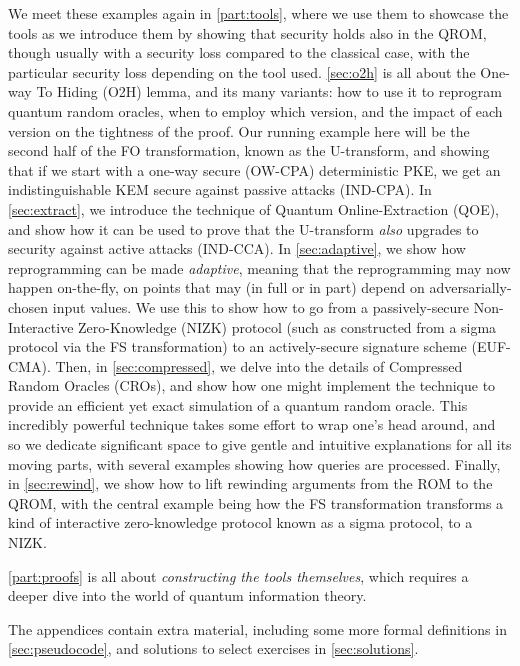     We meet these examples again in \cref{part:tools}, where we use
      them to showcase the tools as we introduce them by showing that security
      holds also in the QROM, though usually with a security loss compared to the
      classical case, with the particular security loss depending on the tool used.
      \cref{sec:o2h} is all about the One-way To Hiding (O2H) lemma, and its many variants: 
      how to use it to reprogram quantum random oracles, when to employ which
      version, and the impact of each version on the tightness of the proof. 
      Our running example here
      will be the second half of the FO transformation, known as the U-transform,
      and showing that if we start with a one-way secure (OW-CPA) deterministic PKE, we
      get an indistinguishable KEM secure against passive attacks (IND-CPA). 
      In \cref{sec:extract}, we introduce the technique of
      Quantum Online-Extraction (QOE), and show how it can be used to prove
      that the U-transform \emph{also} upgrades to security against active attacks
      (IND-CCA).
      In \cref{sec:adaptive}, we show how reprogramming can be made
      \emph{adaptive}, meaning that the reprogramming may now happen
      on-the-fly, on points that may (in full or in part) depend on
      adversarially-chosen input values. We use this to show
      how to go from a passively-secure Non-Interactive Zero-Knowledge (NIZK)
      protocol (such as constructed from a sigma protocol via the FS
      transformation) to an actively-secure signature scheme (EUF-CMA).
      Then, in \cref{sec:compressed}, we delve into the details of 
      Compressed Random Oracles (CROs), and show how one might implement the
      technique to provide an efficient yet exact simulation of a quantum
      random oracle.
      This incredibly powerful technique takes some effort to wrap one's head
      around, and so we dedicate significant space to give gentle and
      intuitive explanations for all its moving parts, with several examples
      showing how queries are processed.
    \ifdraftversion
      Finally, in \cref{sec:rewind}, we show how to lift rewinding arguments
      from the ROM to the QROM, with the central example being how the FS
      transformation transforms a kind of interactive zero-knowledge protocol known
      as a sigma protocol, to a NIZK.
    \fi

    \ifdraftversion
    \cref{part:proofs} is all about \emph{constructing the tools
      themselves}, which requires a deeper dive into the world of quantum
      information theory.
    \fi

    The appendices contain extra material, including some more formal
      definitions in \cref{sec:pseudocode}, and solutions to select
      exercises in \cref{sec:solutions}.

